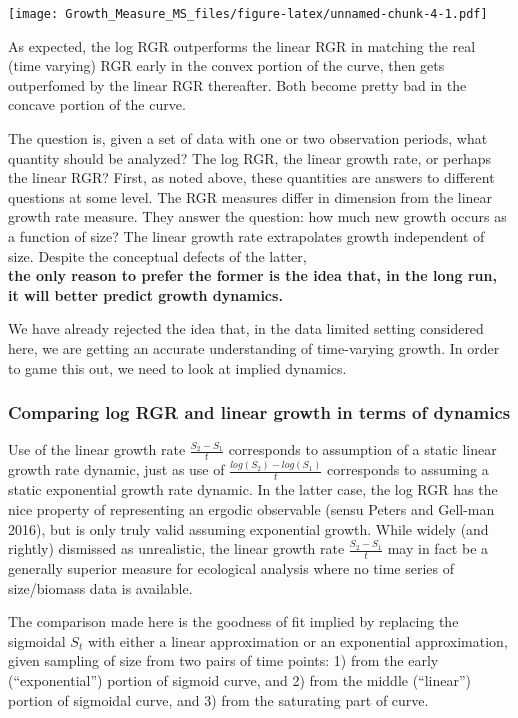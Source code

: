 \documentclass[]{article}
\begin{document}
\texttt{[image: Growth\_Measure\_MS\_files/figure-latex/unnamed-chunk-4-1.pdf]}

As expected, the log RGR outperforms the linear RGR in matching the real
(time varying) RGR early in the convex portion of the curve, then gets
outperfomed by the linear RGR thereafter. Both become pretty bad in the
concave portion of the curve.

The question is, given a set of data with one or two observation
periods, what quantity should be analyzed? The log RGR, the linear
growth rate, or perhaps the linear RGR? First, as noted above, these
quantities are answers to different questions at some level. The RGR
measures differ in dimension from the linear growth rate measure. They
answer the question: how much new growth occurs as a function of size?
The linear growth rate extrapolates growth independent of size. Despite
the conceptual defects of the latter,\\
\textbf{the only reason to prefer the former is the idea that, in the
long run, it will better predict growth dynamics.}

We have already rejected the idea that, in the data limited setting
considered here, we are getting an accurate understanding of
time-varying growth. In order to game this out, we need to look at
implied dynamics.

\subsubsection{Comparing log RGR and linear growth in terms of
dynamics}\label{comparing-log-rgr-and-linear-growth-in-terms-of-dynamics}

Use of the linear growth rate \(\frac{S_2 - S_1}{t}\) corresponds to
assumption of a static linear growth rate dynamic, just as use of
\(\frac{log(S_2) - log(S_1)}{t}\) corresponds to assuming a static
exponential growth rate dynamic. In the latter case, the log RGR has the
nice property of representing an ergodic observable (sensu Peters and
Gell-man 2016), but is only truly valid assuming exponential growth.
While widely (and rightly) dismissed as unrealistic, the linear growth
rate \(\frac{S_2 - S_1}{t}\) may in fact be a generally superior measure
for ecological analysis where no time series of size/biomass data is
available.

The comparison made here is the goodness of fit implied by replacing the
sigmoidal \(S_t\) with either a linear approximation or an exponential
approximation, given sampling of size from two pairs of time points: 1)
from the early (``exponential'') portion of sigmoid curve, and 2) from
the middle (``linear'') portion of sigmoidal curve, and 3) from the
saturating part of curve.
\end{document}
